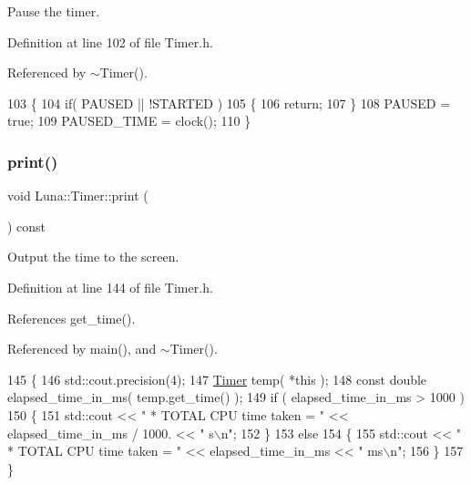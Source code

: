 Pause the timer. 



Definition at line 102 of file Timer.\+h.



Referenced by $\sim$\+Timer().


\begin{DoxyCode}
103     \{
104         \textcolor{keywordflow}{if}( PAUSED || !STARTED )
105         \{
106             \textcolor{keywordflow}{return};
107         \}
108         PAUSED = \textcolor{keyword}{true};
109         PAUSED\_TIME = clock();
110     \}
\end{DoxyCode}
\mbox{\label{classLuna_1_1Timer_ac0292bd7a6e45b269919fc2fe160a8bf}} 
\subsubsection{\texorpdfstring{print()}{print()}}
{\footnotesize\ttfamily void Luna\+::\+Timer\+::print (\begin{DoxyParamCaption}{ }\end{DoxyParamCaption}) const\hspace{0.3cm}{\ttfamily [inline]}}



Output the time to the screen. 



Definition at line 144 of file Timer.\+h.



References get\+\_\+time().



Referenced by main(), and $\sim$\+Timer().


\begin{DoxyCode}
145     \{
146         std::cout.precision(4);
147         \hyperlink{classLuna_1_1Timer_a8505121ba140f41121a57e4404e1d251}{Timer} temp( *\textcolor{keyword}{this} );
148         \textcolor{keyword}{const} \textcolor{keywordtype}{double} elapsed\_time\_in\_ms( temp.get\_time() );
149         \textcolor{keywordflow}{if} ( elapsed\_time\_in\_ms > 1000 )
150         \{
151           std::cout << \textcolor{stringliteral}{"  * TOTAL CPU time taken = "} << elapsed\_time\_in\_ms / 1000. << \textcolor{stringliteral}{" s\(\backslash\)n"};
152         \}
153         \textcolor{keywordflow}{else}
154         \{
155          std::cout << \textcolor{stringliteral}{"  * TOTAL CPU time taken = "} << elapsed\_time\_in\_ms << \textcolor{stringliteral}{" ms\(\backslash\)n"};
156         \}
157     \}
\end{DoxyCode}
\mbox{\label{classLuna_1_1Timer_a7aee89c76f083206cb1ce7fd150f4e81}} 
